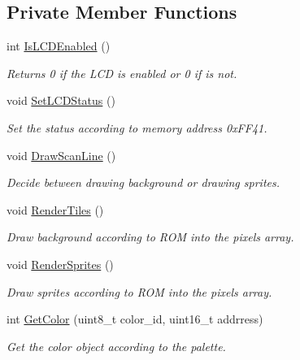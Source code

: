 \subsection*{Private Member Functions}
\begin{DoxyCompactItemize}
\item 
int \mbox{\hyperlink{classGPU_a6ecd1a465bf7bf337bd5a68b1f2c534f}{Is\+L\+C\+D\+Enabled}} ()
\begin{DoxyCompactList}\small\item\em Returns 0 if the L\+CD is enabled or 0 if is not. \end{DoxyCompactList}\item 
\mbox{\label{classGPU_a853749a9269520cc960f086073091697}} 
void \mbox{\hyperlink{classGPU_a853749a9269520cc960f086073091697}{Set\+L\+C\+D\+Status}} ()
\begin{DoxyCompactList}\small\item\em Set the status according to memory address 0x\+F\+F41. \end{DoxyCompactList}\item 
\mbox{\label{classGPU_a6b60ee80bc625af7d695338bda4b2729}} 
void \mbox{\hyperlink{classGPU_a6b60ee80bc625af7d695338bda4b2729}{Draw\+Scan\+Line}} ()
\begin{DoxyCompactList}\small\item\em Decide between drawing background or drawing sprites. \end{DoxyCompactList}\item 
\mbox{\label{classGPU_a553781176d11209bcd137156c3c885e3}} 
void \mbox{\hyperlink{classGPU_a553781176d11209bcd137156c3c885e3}{Render\+Tiles}} ()
\begin{DoxyCompactList}\small\item\em Draw background according to R\+OM into the pixels array. \end{DoxyCompactList}\item 
\mbox{\label{classGPU_a52964b88fff3d7341c965f2fe42dc0c8}} 
void \mbox{\hyperlink{classGPU_a52964b88fff3d7341c965f2fe42dc0c8}{Render\+Sprites}} ()
\begin{DoxyCompactList}\small\item\em Draw sprites according to R\+OM into the pixels array. \end{DoxyCompactList}\item 
int \mbox{\hyperlink{classGPU_ab71b7ac6de12c201a1d90c05590cb858}{Get\+Color}} (uint8\+\_\+t color\+\_\+id, uint16\+\_\+t addrress)
\begin{DoxyCompactList}\small\item\em Get the color object according to the palette. \end{DoxyCompactList}\end{DoxyCompactItemize}

